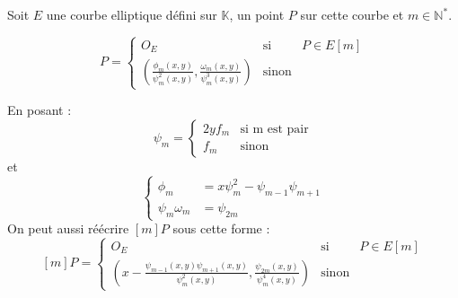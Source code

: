 \documentclass[12pt]{article}
\begin{document}
\begin{thm}
Soit $E$ une courbe elliptique défini sur $\mathbb{K}$, un point $P$ sur cette courbe et $m \in \mathbb{N}^*$.

\begin{equation}
[m]P = 
\left\lbrace
\begin{array}{ccc}
O_E & \mbox{si} & P \in E[m]  \\
\left(    \frac{\phi_m(x,y)}{\psi^2_m(x,y)}, \frac{\omega_m(x,y)}{\psi^3_m(x,y)}\right) & \mbox{sinon}  & 
\end{array}\right.
\end{equation}

En posant : 
\begin{equation*}
\psi_m= \left\lbrace
\begin{array}{cc}
2yf_m & \mbox{si m est pair} \\
f_m & \mbox{sinon}
\end{array}\right.
\end{equation*}
et 
\begin{equation*}
\left\lbrace
\begin{array}{ll}
\phi_m &= x \psi^2_m - \psi_{m-1}\psi_{m+1} \\
\psi_m \omega_m &= \psi_{2m}
\end{array}\right.
\end{equation*}
On peut aussi réécrire $[m]P$ sous cette forme : 
\begin{equation}\label{mP}
[m]P = \left\lbrace
\begin{array}{lll}
O_E & \mbox{si} & P \in E[m]  \\
\left(  x -   \frac{\psi_{m-1}(x,y)\psi_{m+1}(x,y)}{\psi^2_m(x,y)}, \frac{\psi_{2m}(x,y)}{\psi^4_m(x,y)}\right) & \mbox{sinon}  & 
\end{array}\right.
\end{equation}
\end{thm}
\end{document}
